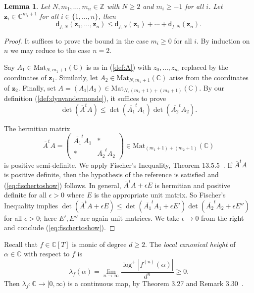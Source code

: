 \documentclass[12pt,oneside,a4]{amsart}
\newcommand{\IC}{\mathbb{C}}
\newcommand{\IZ}{\mathbb{Z}}
\newcommand{\mat}[1]{\mathrm{Mat}_{#1}}
\newcounter{maincounter}
\numberwithin{maincounter}{section}
\numberwithin{equation}{section}
\newtheorem{lemma}[maincounter]{Lemma}
\renewcommand{\mat}{\mathrm{Mat}}
\newcommand{\bfz}{\boldsymbol{z}}
\begin{document}
\begin{lemma}
  \label{lem:fischer}
   Let $N,m_1,\ldots,m_n\in\IZ$
  with $N\ge 2$ and $m_i\ge -1$ for all $i$.
  Let 
  $\bfz_i\in\IC^{m_i+1}$ for all
  $i\in \{1,\ldots,n\}$, then
  \begin{equation*}
    \mathsf{d}_{f,N} (\bfz_1,\ldots,\bfz_n) \le \mathsf{d}_{f,N}(\bfz_1)+\cdots + \mathsf{d}_{f,N}(\bfz_n). 
  \end{equation*}
\end{lemma}
\begin{proof}
  It suffices to prove the bound in the case $m_i\ge 0$ for all $i$.
  By induction on $n$ we may reduce to the case $n=2$.

    Say $A_1\in \mat_{N,m_1+1}(\IC)$ is as in (\ref{def:A}) with
  $z_0,\ldots,z_m$ replaced by the coordinates of $\bfz_1$.
  Similarly, let $A_2\in\mat_{N,m_2+1}(\IC)$ arise from the coordinates
  of $\bfz_2$.
  Finally, set $A = (A_1 | A_2) \in \mat_{N,(m_1+1)+(m_2+1)}(\IC)$.
  By our  definition
  (\ref{def:dynvandermonde}),
  it suffices to prove
  \begin{equation}
    \label{eq:fischertoshow}
    \det(\overline{A}^tA) \le \det(\overline{A_1}^tA_1)
    \det(\overline{A_2}^tA_2).
  \end{equation}

  The hermitian matrix
  \begin{equation*}
    \overline{A}^t A = 
    \left(
      \begin{array}{cc}
        \overline{A_1}^tA_1 & *\\
        * & \overline{A_2}^tA_2
      \end{array}
    \right)\in \mat_{(m_1+1)+(m_2+1)}(\IC)
  \end{equation*}
  is positive semi-definite.
  We apply Fischer's Inequality,
  Theorem 13.5.5~\cite{Mirsky:IntroLA}. If $\overline{A}^tA$ is
  positive definite, then the hypothesis of the reference is
  satisfied and (\ref{eq:fischertoshow}) follows.  In general,  
  $\overline{A}^t A+\epsilon E$ is hermitian and positive definite for all
  $\epsilon>0$ where $E$ is the appropriate unit matrix.
  So Fischer's Inequality implies
  $\det( \overline{A}^tA +\epsilon E)\le
  \det(\overline{A_1}^tA_1+\epsilon E')
  \det(\overline{A_2}^tA_2+\epsilon E'')$
  for all $\epsilon > 0$; here $E',E''$ are again unit matrices.
  We take $\epsilon\rightarrow 0$ from the right and conclude
  (\ref{eq:fischertoshow}). 
\end{proof}

Recall that $f\in\IC[T]$ is monic of degree $d\ge 2$. 
The \textit{local canonical height} of $\alpha\in\IC$ with respect to $f$ is
\begin{equation}
  \label{def:lambdafcomplex}
  \lambda_f(\alpha) = \lim_{n\rightarrow\infty} \frac{\log^+
  |f^{(n)}(\alpha)|}{d^n}\ge 0.
\end{equation}
Then $\lambda_f\colon\IC\rightarrow [0,\infty)$ is a continuous map,
by Theorem 3.27 and Remark 3.30~\cite{Silverman:gtm241}.
\end{document}
